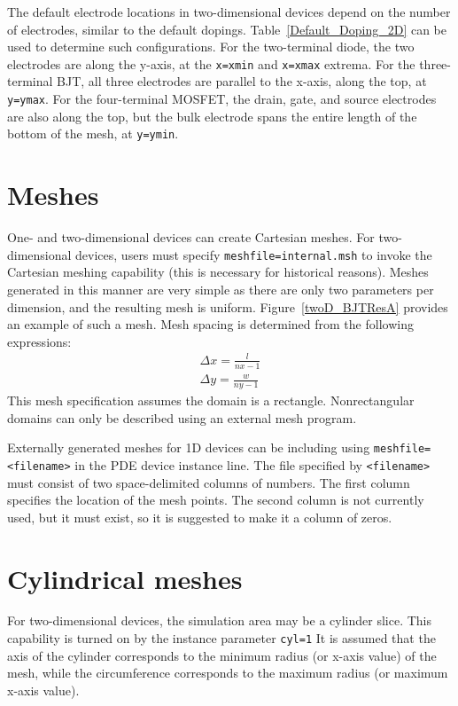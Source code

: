 The default electrode locations in two-dimensional devices depend on the number 
of electrodes, similar to the default dopings.  Table~\ref{Default_Doping_2D} can be 
used to determine such configurations.  For the two-terminal diode, 
the two electrodes are along the  y-axis, at the \texttt{x=xmin} and 
\texttt{x=xmax} extrema.
For the three-terminal BJT, all three electrodes are parallel to the
x-axis, along the top, at \texttt{y=ymax}.  For the four-terminal MOSFET, the 
drain, gate, and source electrodes are also along the top, but the bulk 
electrode spans the entire length of the bottom of the mesh, at 
\texttt{y=ymin}.

\section{Meshes} \label{PDE_Mesh}
One- and two-dimensional devices can create Cartesian meshes.
For two-dimensional devices, users must specify \texttt{meshfile=internal.msh} 
to invoke the Cartesian meshing capability (this is necessary for historical reasons).
Meshes generated in this manner are very simple as there are only two
parameters per dimension, and the resulting mesh is uniform.  Figure~\ref{twoD_BJTResA} 
provides an example of such a mesh.  Mesh spacing is determined from the following expressions:
\begin{eqnarray}
  \Delta x = \frac{l}{nx-1}  \\
  \Delta y = \frac{w}{ny-1} 
\end{eqnarray}
This mesh specification assumes the domain is a rectangle.  
Nonrectangular domains can only be described using an external mesh program.

Externally generated meshes for 1D devices can be including using
\texttt{meshfile=<filename>} in the PDE device instance line. The file
specified by \texttt{<filename>} must consist of two space-delimited columns of
numbers. The first column specifies the location of the mesh points. The second
column is not currently used, but it must exist, so it is suggested to make it
a column of zeros.

\section{Cylindrical meshes}
For two-dimensional devices, the simulation area may be a cylinder slice.  
This capability is turned on by the instance parameter {\tt cyl=1} 
It is assumed that the
axis of the cylinder corresponds to the minimum radius (or x-axis value) of the 
mesh, while the circumference corresponds to the maximum radius (or maximum x-axis value).  

